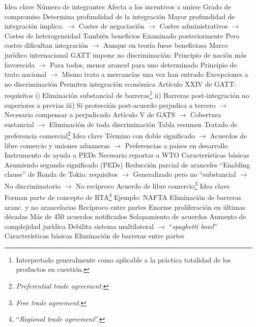 \documentclass{nuevotema}
\begin{document}
\begin{esquemal}
	\1 
		\2 Idea clave
			\3 Número de integrantes
				\4 Afecta a los incentivos a unirse
			\3 Grado de compromiso
				\4 Determina profundidad de la integración
				\4 Mayor profundidad de integración implica:
				\4[] $\to$ Costes de negociación
				\4[] $\to$ Costes administrativos
				\4[] $\to$ Costes de heterogeneidad
				\4 También beneficios
				\4[] Examinado posteriormente
				\4[] Pero costes dificultan integración
				\4[] $\to$ Aunque en teoría fuese beneficiosa
			\3 Marco jurídico internacional
				\4 GATT impone no discriminación:
				\4[] Principio de nación más favorecida
				\4[] $\to$ Para todos, menor arancel para uno determinado
				\4[] Principio de trato nacional
				\4[] $\to$ Mismo trato a mercancías una vez han entrado
				\4 Excepciones a no discriminación
				\4[] Permiten integración económica
				\4[] Artículo XXIV de GATT: requisitos
				\4[] i) Eliminación substancial de barreras\footnote{Interpretado generalmente como aplicable a la práctica totalidad de los productos en cuestión.}
				\4[] ii) Barreras post-integración no superiores a previas
				\4[] iii) Si protección post-acuerdo perjudica a tercero
				\4[] $\to$ Necesario compensar a perjudicado
				\4[] Artículo V de GATS
				\4[] $\to$ Cobertura sustancial
				\4[] $\to$ Eliminación de toda discriminación
			\3 Tabla resumen
				\4[] 
		\2 Tratado de preferencia comercial\footnote{\textit{Preferential trade agreement}.}
			\3 Idea clave
				\4 Término con doble significado
				\4[] $\to$ Acuerdos de libre comercio y uniones aduaneras
				\4[] $\to$ Preferencias a países en desarrollo
				\4 Instrumento de ayuda a PEDs
				\4 Necesario reportar a WTO
			\3 Características básicas
				\4 Asumiendo segundo significado (PEDs)
				\4 Reducción parcial de aranceles
				\4[] ``Enabling clause'' de Ronda de Tokio: requisitos
				\4[] $\to$ Generalizado pero no ``substancial
				\4[] $\to$ No discriminatorio
				\4[] $\to$ No recíproco
		\2 Acuerdo de libre comercio\footnote{\textit{Free trade agreement}.}
			\3 Idea clave
				\4 Forman parte de concepto de RTA\footnote{``\textit{Regional trade agreement}''.}
				\4 Ejemplo: NAFTA
				\4 Eliminación de barreras aranc. y no arancelarias
				\4 Recíproco entre partes
				\4 Enorme proliferación en últimas décadas
				\4[] Más de 450 acuerdos notificados
				\4[] Solapamiento de acuerdos
				\4[] Aumento de complejidad jurídica
				\4[] Debilita sistema multilateral
				\4[] $\to$ ``\textit{spaghetti bowl}''
			\3 Características básicas
				\4 Eliminación de barreras entre partes

\end{esquemal}
\end{document}
